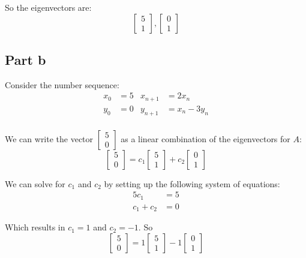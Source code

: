 So the eigenvectors are:
\[
	\begin{bmatrix}5\\1\end{bmatrix}, \begin{bmatrix}0\\1\end{bmatrix}
\]

\subsection{Part b}
Consider the number sequence:
\begin{align*}
	x_0 & = 5 & x_{n+1} & = 2x_n       \\
	y_0 & = 0 & y_{n+1} & = x_n - 3y_n \\
\end{align*}


We can write the vector $\begin{bmatrix}5\\0\end{bmatrix}$ as a linear combination of the eigenvectors for $A$:
\[
	\begin{bmatrix}5\\0\end{bmatrix} = c_1\begin{bmatrix}5\\1\end{bmatrix} + c_2\begin{bmatrix}0\\1\end{bmatrix}
\]

We can solve for $c_1$ and $c_2$ by setting up the following system of equations:
\begin{align*}
	5c_1      & = 5 \\
	c_1 + c_2 & = 0
\end{align*}

Which results in $c_1 = 1$ and $c_2 = -1$. So
\[
	\begin{bmatrix}5\\0\end{bmatrix} = 1\begin{bmatrix}5\\1\end{bmatrix} - 1\begin{bmatrix}0\\1\end{bmatrix}
\]

